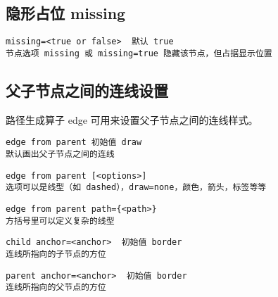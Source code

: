 \documentclass[UTF8]{ctexart}
\begin{document}
\subsection{ 隐形占位 missing }

\begin{lstlisting}
missing=<true or false>  默认 true
节点选项 missing 或 missing=true 隐藏该节点，但占据显示位置
\end{lstlisting}





\subsection{ 父子节点之间的连线设置 }

路径生成算子 edge 可用来设置父子节点之间的连线样式。
\begin{lstlisting}
edge from parent 初始值 draw
默认画出父子节点之间的连线
\end{lstlisting}
\begin{lstlisting}
edge from parent [<options>]
选项可以是线型（如 dashed），draw=none，颜色，箭头，标签等等
\end{lstlisting}
\begin{lstlisting}
edge from parent path={<path>}
方括号里可以定义复杂的线型
\end{lstlisting}
\begin{lstlisting}
child anchor=<anchor>  初始值 border
连线所指向的子节点的方位
\end{lstlisting}
\begin{lstlisting}
parent anchor=<anchor>  初始值 border
连线所指向的父节点的方位
\end{lstlisting}
\end{document}

